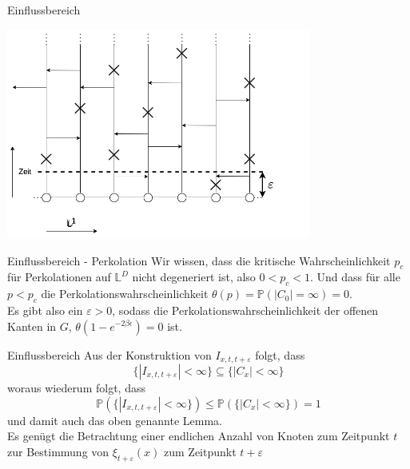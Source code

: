 \documentclass[11pt]{beamer}
\begin{document}
\begin{frame}{Einflussbereich}
    \begin{center}
        \includegraphics[width=0.75\textwidth]{images/contact process epsilon.png}
    \end{center}
\end{frame}

\begin{frame}{Einflussbereich - Perkolation}
    Wir wissen, dass die kritische Wahrscheinlichkeit $p_c$ für Perkolationen
    auf $\mathbb{L}^D$ nicht degeneriert ist, also $0 < p_c < 1$.
    Und dass für alle $p < p_c$ die Perkolationswahrscheinlichkeit
    $\theta(p) = \mathbb{P}(|C_0| = \infty) = 0$.
    \vspace{1cm}
    \\
    Es gibt also ein $\varepsilon > 0$, sodass die Perkolationswahrscheinlichkeit der
    offenen Kanten in $G$, $\theta(1 - e^{-2\beta\epsilon}) = 0$ ist.
\end{frame}

\begin{frame}{Einflussbereich}
    Aus der Konstruktion von $I_{x, t, t + \varepsilon}$ folgt, dass
    \begin{equation*}
        \{ |I_{x, t, t + \varepsilon}| < \infty \} \subseteq \{ |C_x| < \infty \}   
    \end{equation*}
    woraus wiederum folgt, dass
    \begin{equation*}
        \mathbb{P}(\{ |I_{x, t, t + \varepsilon}| < \infty \}) \leq \mathbb{P}(\{ |C_x| < \infty \}) = 1
    \end{equation*}
    und damit auch das oben genannte Lemma.
    \\
    Es genügt die Betrachtung einer endlichen Anzahl von Knoten zum Zeitpunkt $t$ zur Bestimmung
    von $\xi_{t + \varepsilon}(x)$ zum Zeitpunkt $t + \varepsilon$
\end{frame}
\end{document}
